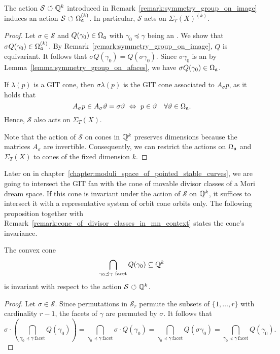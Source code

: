 \begin{prop}
	\label{proposition:symmetry_group_on_orbit_cones}
	The action $\mathcal{S}{\ \circlearrowleft\ }\mathbb{Q}^k$ introduced in Remark~\ref{remark:symmetry_group_on_image} induces an action $\mathcal{S}{\ \circlearrowleft\ }\Omega_{\mathfrak{a}}^{(k)}$. In particular, $\mathcal{S}$ acts on $\Sigma_T(X)^{(k)}$.
\end{prop}
\begin{proof}
	Let $\sigma\in\mathcal{S}$ and $Q(\gamma_0)\in\Omega_{\mathfrak{a}}$ with $\gamma_0\preceq\gamma$ being an \aface{}. We show that $\sigma Q(\gamma_0)\in\Omega_{\mathfrak{a}}^{(k)}$. By Remark~\ref{remark:symmetry_group_on_image}, $Q$ is equivariant. It follows that $\sigma Q(\gamma_0) = Q(\sigma\gamma_0)$. Since $\sigma\gamma_0$ is an \aface{} by Lemma~\ref{lemma:symmetry_group_on_afaces}, we have $\sigma Q(\gamma_0)\in\Omega_{\mathfrak{a}}$.
	
	If $\lambda(p)$ is a GIT cone, then $\sigma \lambda(p)$ is the GIT cone associated to $A_\sigma p$, as it holds that
	$$A_\sigma p \in A_\sigma \vartheta = \sigma \vartheta \ \Leftrightarrow\ p\in \vartheta\quad \forall \vartheta\in\Omega_{\mathfrak{a}}.$$
	Hence, $\mathcal{S}$ also acts on $\Sigma_T(X)$.
	
	Note that the action of $\mathcal{S}$ on cones in $\mathbb{Q}^k$ preserves dimensions because the matrices $A_\sigma$ are invertible. Consequently, we can restrict the actions on $\Omega_{\mathfrak{a}}$ and $\Sigma_T(X)$ to cones of the fixed dimension $k$.
\end{proof}

Later on in chapter~\ref{chapter:moduli_space_of_pointed_stable_curves}, we are going to intersect the GIT fan with the cone of movable divisor classes of a Mori dream space. If this cone is invariant under the action of $\mathcal{S}$ on $\mathbb{Q}^k$, it suffices to intersect it with a representative system of orbit cone orbits only. The following proposition together with Remark~\ref{remark:cone_of_divisor_classes_in_mn_context} states the cone's invariance. 

\begin{prop}
	\label{prop:invariance_moving_cone}
	The convex cone
	$$\bigcap_{\gamma_0 \preceq \gamma\ \mathrm{facet}} Q(\gamma_0)\subseteq \mathbb{Q}^k$$
	is invariant with respect to the action $\mathcal{S}{\ \circlearrowleft\ } \mathbb{Q}^k$.
\end{prop}
\begin{proof}
	Let $\sigma\in\mathcal{S}$. Since permutations in $\mathcal{S}_r$ permute the subsets of $\{1,\dots,r\}$ with cardinality $r-1$, the facets of $\gamma$ are permuted by $\sigma$. It follows that
	$$\sigma\cdot\left(\bigcap_{\gamma_0 \preceq \gamma\ \mathrm{facet}} Q(\gamma_0) \right)
	= \bigcap_{\gamma_0 \preceq \gamma\ \mathrm{facet}} \sigma\cdot Q(\gamma_0)
	= \bigcap_{\gamma_0 \preceq \gamma\ \mathrm{facet}} Q(\sigma \gamma_0)
	= \bigcap_{\gamma_0 \preceq \gamma\ \mathrm{facet}} Q(\gamma_0).$$
\end{proof}

